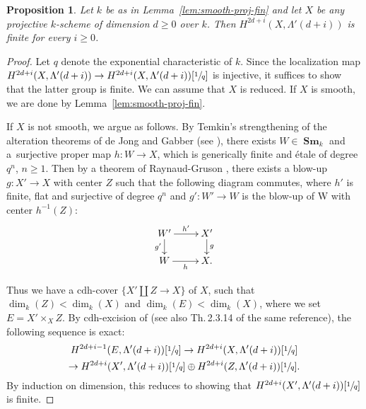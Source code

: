 \documentclass[11pt]{article}
\numberwithin{equation}{section}
\newcommand{\cdh}{\mathrm{cdh}}
\newtheorem{prop}[thm]{Proposition}
\theoremstyle{definition}
\newcommand{\lemref}{Lemma~\ref}
\DeclareMathOperator{\Sm}{\mathbf{Sm}}
\begin{document}
\begin{prop}\label{prop:Sing-proj-fin}
Let $k$ be as in \lemref{lem:smooth-proj-fin} and
let $X$ be any projective $k$-scheme of dimension $d \ge 0$ over
$k$. Then $H^{2d+i}(X, \Lambda'(d+i))$ is finite for every $i \ge 0$.
\end{prop}
\begin{proof}
Let $q$ denote the exponential characteristic of $k$.
Since the localization map $H^{2d+i}(X, \Lambda'(d+i)) \to
H^{2d+i}(X, \Lambda'(d+i))[\sfrac{1}{q}]$ is injective, it suffices to show that
the latter group is finite.
We can assume that $X$ is reduced.
If $X$ is smooth, we are done by \lemref{lem:smooth-proj-fin}.

If $X$ is not smooth, we argue as follows. By
Temkin's strengthening of the alteration theorems of de Jong and Gabber
(see \cite[Th.\,1.2.5]{Temkin}),
there exists $W\in \Sm _k$ and a~surjective proper map $h:W\to X$,
which is generically finite and étale of degree
$q^n$, $n\geq 1$. Then by a theorem of Raynaud-Gruson
\cite[Th.\,5.2.2]{Ray}, there exists a blow-up $g:X'\to X$ with
center $Z$
such that the following diagram commutes, where $h'$ is finite, flat and surjective
of degree $q^n$
and $g':W'\to W$ is the blow-up of W with center $h^{-1}(Z)$:\vspace*{-3pt}
\begin{align} \label{bwupsqr.1}
\begin{array}{c}
\xymatrix@R=.5cm{W' \ar[d]_-{g'} \ar[r]^-{h'}& X' \ar[d]^-{g} \\
W \ar[r]_-{h} & X.}
\end{array}
\end{align}

Thus we have a $\cdh$-cover
$\{X' \amalg Z \to X\}$ of $X$, such that $\dim_k(Z) < \dim_k(X)$ and
$\dim_k(E) < \dim_k(X)$, where we set $E = X' \times _{X} Z$.
By $\cdh$-excision of \cite[Prop.\,5.3.4]{Kelly} (see also Th.\,2.3.14 of
the same reference), the following sequence is exact:
\begin{multline*}
H^{2d+i-1}(E, \Lambda'(d+i))[\sfrac{1}{q}]
\to
H^{2d+i}(X, \Lambda'(d+i))[\sfrac{1}{q}]\\
\to H^{2d+i}(X', \Lambda'(d+i))[\sfrac{1}{q}] \oplus
H^{2d+i}(Z, \Lambda'(d+i))[\sfrac{1}{q}].
\end{multline*}
By induction on dimension, this reduces to showing that
$H^{2d+i}(X', \Lambda'(d+i))[\sfrac{1}{q}]$ is finite.


\end{proof}
\end{document}
